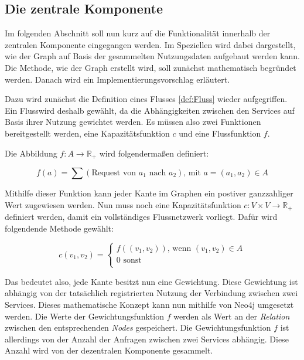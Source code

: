 \subsection{Die zentrale Komponente}

Im folgenden Abschnitt soll nun kurz auf die Funktionalität innerhalb der zentralen Komponente eingegangen werden. Im Speziellen wird dabei dargestellt, wie der Graph auf Basis der gesammelten Nutzungsdaten aufgebaut werden kann. Die Methode, wie der Graph erstellt wird, soll zunächst mathematisch begründet werden. Danach wird ein Implementierungsvorschlag erläutert.

Dazu wird zunächst die Definition eines Flusses \vref{def:Fluss} wieder aufgegriffen. Ein Flusswird deshalb gewählt, da die Abhängigkeiten zwischen den Services auf Basis ihrer Nutzung gewichtet werden. Es müssen also zwei Funktionen bereitgestellt werden, eine Kapazitätsfunktion $c$ und eine Flussfunktion $f$.

Die Abbildung $f: A \rightarrow \mathbb{R_+}$ wird folgendermaßen definiert:

\begin{equation*}
	f(a) = \sum (\text{Request von } a_1 \text{ nach } a_2) \text{, mit } a = (a_1, a_2) \in A
\end{equation*}

Mithilfe dieser Funktion kann jeder Kante im Graphen ein postiver ganzzahliger Wert zugewiesen werden. Nun muss noch eine Kapazitätsfunktion $c: V \times V \rightarrow \mathbb{R_+}$ definiert werden, damit ein vollständiges Flussnetzwerk vorliegt. Dafür wird folgendende Methode gewählt:

\begin{equation*}
	c(v_1,v_2) = \begin{cases}
		f((v_1,v_2)) \text{, wenn } (v_1,v_2) \in A\\
		0 \text{ sonst } \\
	\end{cases}
\end{equation*}

Das bedeutet also, jede Kante besitzt nun eine Gewichtung. Diese Gewichtung ist abhängig von der tatsächlich registrierten Nutzung der Verbindung zwischen zwei Services. Dieses mathematische Konzept kann nun mithilfe von Neo4j umgesetzt werden. Die Werte der Gewichtungsfunktion $f$ werden als Wert an der \textit{Relation} zwischen den entsprechenden \textit{Nodes} gespeichert. Die Gewichtungsfunktion $f$ ist allerdings von der Anzahl der Anfragen zwischen zwei Services abhängig. Diese Anzahl wird von der dezentralen Komponente gesammelt. 

